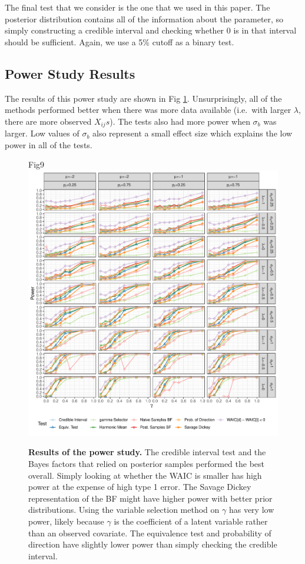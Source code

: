 \documentclass[10pt,letterpaper]{article}
\begin{document}
The final test that we consider is the one that we used in this paper.
The posterior distribution contains all of the information about the
parameter, so simply constructing a credible interval and checking
whether 0 is in that interval should be sufficient. Again, we use a 5\%
cutoff as a binary test.

\hypertarget{power-study-results}{%
\subsection{Power Study Results}\label{power-study-results}}

The results of this power study are shown in Fig \ref{powers}.
Unsurprisingly, all of the methods performed better when there was more
data available (i.e.~with larger \(\lambda\), there are more observed $X_{ij}s$). The tests also had more
power when \(\sigma_b\) was larger.
Low values of $\sigma_b$ also represent a small effect size which explains the low power in all of the tests.

\begin{figure}[h!]
\centering
Fig9
\includegraphics[width=\textwidth]{Joint_Count_Files/powers-1.pdf}
\caption{\label{powers}\textbf{Results of the power study.} The credible interval
test and the Bayes factors that relied on posterior samples performed
the best overall. Simply looking at whether the WAIC is smaller has high
power at the expense of high type 1 error. The Savage Dickey
representation of the BF might have higher power with better prior
distributions. Using the variable selection method on \(\gamma\) has
very low power, likely because \(\gamma\) is the coefficient of a latent
variable rather than an observed covariate. The equivalence test and
probability of direction have slightly lower power than simply checking
the credible interval.}
\end{figure}
\end{document}
